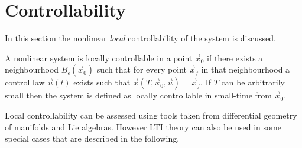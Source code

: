 \section{Controllability}
In this section the nonlinear \emph{local} controllability of the system is discussed.
\par
A nonlinear system is locally controllable in a point $\vec{x}_0$ if there exists
a neighbourhood $B_\epsilon (\vec{x}_0)$ such that for every point $\vec{x}_f$
in that neighbourhood a control law $\vec{u}(t)$ exists such that  $\vec{x}(T, \vec{x}_0, \vec{u}) = \vec{x}_f$.
If $T$ can be arbitrarily small then the system is defined as locally
controllable in small-time from $\vec{x}_{0}$.
\par
Local controllability can be assessed using tools taken from  differential geometry of manifolds
and Lie algebras. However LTI theory can also be used in some special cases that are described
in the following.


